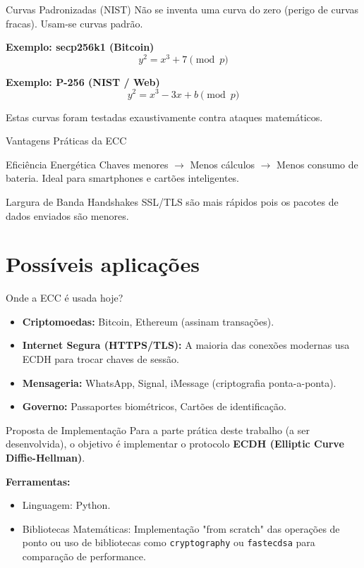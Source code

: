 \documentclass[aspectratio=169]{beamer}
\begin{document}
\begin{frame}{Curvas Padronizadas (NIST)}
  Não se inventa uma curva do zero (perigo de curvas fracas). Usam-se curvas padrão.
  
  \textbf{Exemplo: secp256k1 (Bitcoin)}
  $$ y^2 = x^3 + 7 \pmod p $$
  
  \textbf{Exemplo: P-256 (NIST / Web)}
  $$ y^2 = x^3 - 3x + b \pmod p $$
  
  Estas curvas foram testadas exaustivamente contra ataques matemáticos.
\end{frame}

\begin{frame}{Vantagens Práticas da ECC}
  \begin{block}{Eficiência Energética}
    Chaves menores $\to$ Menos cálculos $\to$ Menos consumo de bateria. Ideal para smartphones e cartões inteligentes.
  \end{block}
  
  \begin{block}{Largura de Banda}
    Handshakes SSL/TLS são mais rápidos pois os pacotes de dados enviados são menores.
  \end{block}
\end{frame}

\section{Possíveis aplicações}

\begin{frame}{Onde a ECC é usada hoje?}
  \begin{itemize}
      \item \textbf{Criptomoedas:} Bitcoin, Ethereum (assinam transações).
      \item \textbf{Internet Segura (HTTPS/TLS):} A maioria das conexões modernas usa ECDH para trocar chaves de sessão.
      \item \textbf{Mensageria:} WhatsApp, Signal, iMessage (criptografia ponta-a-ponta).
      \item \textbf{Governo:} Passaportes biométricos, Cartões de identificação.
  \end{itemize}
\end{frame}

\begin{frame}{Proposta de Implementação}
  Para a parte prática deste trabalho (a ser desenvolvida), o objetivo é implementar o protocolo \textbf{ECDH (Elliptic Curve Diffie-Hellman)}.
  
  \textbf{Ferramentas:}
  \begin{itemize}
      \item Linguagem: Python.
      \item Bibliotecas Matemáticas: Implementação "from scratch" das operações de ponto ou uso de bibliotecas como \texttt{cryptography} ou \texttt{fastecdsa} para comparação de performance.
  \end{itemize}
\end{frame}
\end{document}
